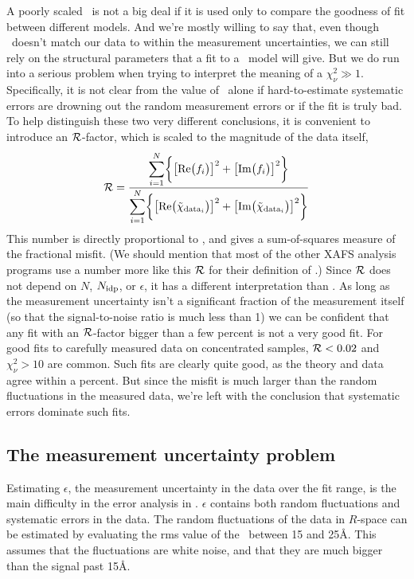 {A poorly scaled \chisqr\ is not a big deal if it is used only to
compare the goodness of fit between different models.  And we're
mostly willing to say that, even though \feff\ doesn't match our data
to within the measurement uncertainties, we can still rely on the
structural parameters that a fit to a \feff\ model will give.  But we
do run into a serious problem when trying to interpret the meaning of
a $\chi^2_\nu \gg 1$.  Specifically, it is not clear from the value of
\redchi\ alone if hard-to-estimate systematic errors are drowning out
the random measurement errors or if the fit is truly bad.  To help
distinguish these two very different conclusions, it is convenient to
introduce an $\cal R$-factor, which is scaled to the magnitude of the
data itself, 
\begin{equation}
 {
\cal R} = { { \displaystyle \sum_{i=1}^{N} 
   \biggl\{ {\bigl[ {\rm Re} \big( f_i \big) \bigr]^2 +
             \bigl[ {\rm Im} \big( f_i \big) \bigr]^2 } \biggl\} } 
\over { \displaystyle \sum_{i=1}^{N} 
   \biggl\{{\bigl[ {\rm Re} \big(\tilde\chi_{{\rm data}_i} \big)\bigr]^2 +
            \bigl[ {\rm Im} \big(\tilde\chi_{{\rm data}_i} \big)\bigr]^2} 
   \biggl\} } } 
\end{equation}
\noindent This number is directly
proportional to \chisqr, and gives a sum-of-squares measure of the
fractional misfit.  (We should mention that most of the other XAFS
analysis programs use a number more like this $\cal R$ for their
definition of \chisqr.)  Since $\cal R$ does not depend on $N$,
$N_{\rm idp}$, or $\epsilon$, it has a different interpretation than
\chisqr.  As long as the measurement uncertainty isn't a significant
fraction of the measurement itself (so that the signal-to-noise ratio
is much less than 1) we can be confident that any fit with an $\cal
R$-factor bigger than a few percent is not a very good fit. For good
fits to carefully measured data on concentrated samples, ${\cal R}
< 0.02$ and $\chi^2_{\nu} > 10$ are common.  Such fits are
clearly quite good, as the theory and data agree within a percent.  
But since the misfit is much larger than the random fluctuations in
the measured data, we're left with the conclusion that systematic
errors dominate such fits. 


\subsection{The measurement uncertainty problem}

Estimating $\epsilon$, the measurement uncertainty in the data over the
fit range, is the main difficulty in the error analysis in \feffit.
$\epsilon$ contains both random fluctuations and systematic errors in
the data.  The random fluctuations of the data in $R$-space can be
estimated by evaluating the rms value of the \chir\ between 15 and
25\AA.  This assumes that the fluctuations are white noise, and that
they are much bigger than the signal past 15\AA.

}
